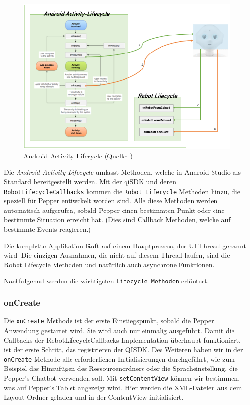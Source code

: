\begin{figure}[H]
    \centering
    \includegraphics[width=14cm]{Figures/AppChapter/4_1_3.png}
    \caption{Android Activity-Lifecycle (Quelle: \cite{AALife})}
    \label{fig:AAL}
    \centering
\end{figure}

Die \textit{Android Activity Lifecycle} umfasst Methoden, welche in Android Studio als Standard bereitgestellt werden. Mit der qiSDK und deren \verb|RobotLifecycleCallbacks| kommen die \verb|Robot Lifecycle| Methoden hinzu, die speziell für Pepper entiwckelt worden sind. Alle diese Methoden werden automatisch aufgerufen, sobald Pepper einen bestimmten Punkt oder eine bestimmte Situation erreicht hat. (Dies sind Callback Methoden, welche auf bestimmte Events reagieren.)

Die komplette Applikation läuft auf einem Hauptprozess, der UI-Thread genannt wird. Die einzigen Ausnahmen, die nicht auf diesem Thread laufen, sind die Robot Lifecycle Methoden und natürlich auch asynchrone Funktionen.

Nachfolgennd werden die wichtigsten \verb|Lifecycle-Methoden| erläutert.

\subsubsection{onCreate}

Die \verb|onCreate| Methode ist der erste Einstiegspunkt, sobald die Pepper Anwendung gestartet wird. Sie wird auch nur einmalig ausgeführt. Damit die Callbacks der RobotLifecycleCallbacks Implementation überhaupt funktioniert, ist der erste Schritt, das registrieren der QISDK. Des Weiteren haben wir in der \verb|onCreate| Methode alle erforderlichen Initialisierungen durchgeführt, wie zum Beispiel das Hinzufügen des Ressourcenordners oder die Spracheinstellung, die Pepper's Chatbot verwenden soll.
Mit \verb|setContentView| können wir bestimmen, was auf Pepper's Tablet angezeigt wird. Hier werden die XML-Dateien aus dem Layout Ordner geladen und in der ContentView initialisiert. \\

